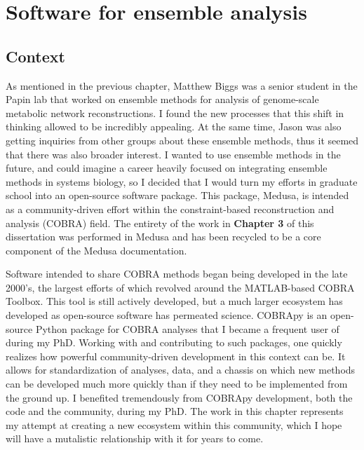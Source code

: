 \documentclass[11pt,twocolumn,notitlepage,openany,twoside]{book}
\begin{document}
\chapter{Software for ensemble analysis}
\begin{refsection}

\section{Context}

As mentioned in the previous chapter, Matthew Biggs was a senior student in the Papin lab that worked on ensemble methods for analysis of genome-scale metabolic network reconstructions. I found the new processes that this shift in thinking allowed to be incredibly appealing. At the same time, Jason was also getting inquiries from other groups about these ensemble methods, thus it seemed that there was also broader interest. I wanted to use ensemble methods in the future, and could imagine a career heavily focused on integrating ensemble methods in systems biology, so I decided that I would turn my efforts in graduate school into an open-source software package. This package, Medusa, is intended as a community-driven effort within the constraint-based reconstruction and analysis (COBRA) field. The entirety of the work in \textbf{Chapter 3} of this dissertation was performed in Medusa and has been recycled to be a core component of the Medusa documentation.

Software intended to share COBRA methods began being developed in the late 2000's, the largest efforts of which revolved around the MATLAB-based COBRA Toolbox. This tool is still actively developed, but a much larger ecosystem has developed as open-source software has permeated science. COBRApy is an open-source Python package for COBRA analyses that I became a frequent user of during my PhD. Working with and contributing to such packages, one quickly realizes how powerful community-driven development in this context can be. It allows for standardization of analyses, data, and a chassis on which new methods can be developed much more quickly than if they need to be implemented from the ground up. I benefited tremendously from COBRApy development, both the code and the community, during my PhD. The work in this chapter represents my attempt at creating a new ecosystem within this community, which I hope will have a mutalistic relationship with it for years to come.


\end{refsection}
\end{document}
